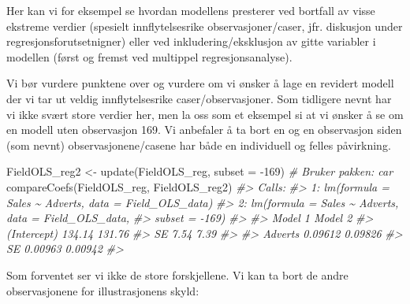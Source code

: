 \documentclass[
]{article}
\newenvironment{Shaded}{\begin{snugshade}}{\end{snugshade}}
\newcommand{\AttributeTok}[1]{\textcolor[rgb]{0.77,0.63,0.00}{#1}}
\newcommand{\CommentTok}[1]{\textcolor[rgb]{0.56,0.35,0.01}{\textit{#1}}}
\newcommand{\DecValTok}[1]{\textcolor[rgb]{0.00,0.00,0.81}{#1}}
\newcommand{\FunctionTok}[1]{\textcolor[rgb]{0.00,0.00,0.00}{#1}}
\newcommand{\NormalTok}[1]{#1}
\newcommand{\OtherTok}[1]{\textcolor[rgb]{0.56,0.35,0.01}{#1}}
\newcommand{\SpecialCharTok}[1]{\textcolor[rgb]{0.00,0.00,0.00}{#1}}
\begin{document}
Her kan vi for eksempel se hvordan modellens presterer ved bortfall av visse ekstreme verdier (spesielt innflytelsesrike observasjoner/caser, jfr. diskusjon under regresjonsforutsetnigner) eller ved inkludering/eksklusjon av gitte variabler i modellen (først og fremst ved multippel regresjonsanalyse).

Vi bør vurdere punktene over og vurdere om vi ønsker å lage en revidert modell der vi tar ut veldig innflytelsesrike caser/observasjoner. Som tidligere nevnt har vi ikke svært store verdier her, men la oss som et eksempel si at vi ønsker å se om en modell uten observasjon 169. Vi anbefaler å ta bort en og en observasjon siden (som nevnt) observasjonene/casene har både en individuell og felles påvirkning.

\begin{Shaded}
\begin{Highlighting}[]
\NormalTok{FieldOLS\_reg2 }\OtherTok{\textless{}{-}} \FunctionTok{update}\NormalTok{(FieldOLS\_reg, }\AttributeTok{subset =} \SpecialCharTok{{-}}\DecValTok{169}\NormalTok{)}
\CommentTok{\# Bruker pakken: car}
\FunctionTok{compareCoefs}\NormalTok{(FieldOLS\_reg, FieldOLS\_reg2)}
\CommentTok{\#\textgreater{} Calls:}
\CommentTok{\#\textgreater{} 1: lm(formula = Sales \textasciitilde{} Adverts, data = Field\_OLS\_data)}
\CommentTok{\#\textgreater{} 2: lm(formula = Sales \textasciitilde{} Adverts, data = Field\_OLS\_data, }
\CommentTok{\#\textgreater{}   subset = {-}169)}
\CommentTok{\#\textgreater{} }
\CommentTok{\#\textgreater{}             Model 1 Model 2}
\CommentTok{\#\textgreater{} (Intercept)  134.14  131.76}
\CommentTok{\#\textgreater{} SE             7.54    7.39}
\CommentTok{\#\textgreater{}                            }
\CommentTok{\#\textgreater{} Adverts     0.09612 0.09826}
\CommentTok{\#\textgreater{} SE          0.00963 0.00942}
\CommentTok{\#\textgreater{} }
\end{Highlighting}
\end{Shaded}

Som forventet ser vi ikke de store forskjellene. Vi kan ta bort de andre observasjonene for illustrasjonens skyld:
\end{document}
